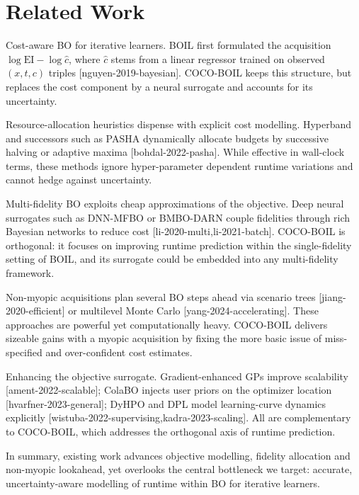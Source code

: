 \documentclass{article}
\begin{document}
\section{Related Work}
Cost-aware BO for iterative learners. BOIL first formulated the acquisition $\log \mathrm{EI} - \log \hat{c}$, where $\hat{c}$ stems from a linear regressor trained on observed $(x,t,c)$ triples [nguyen-2019-bayesian]. COCO-BOIL keeps this structure, but replaces the cost component by a neural surrogate and accounts for its uncertainty.

Resource-allocation heuristics dispense with explicit cost modelling. Hyperband and successors such as PASHA dynamically allocate budgets by successive halving or adaptive maxima [bohdal-2022-pasha]. While effective in wall-clock terms, these methods ignore hyper-parameter dependent runtime variations and cannot hedge against uncertainty.

Multi-fidelity BO exploits cheap approximations of the objective. Deep neural surrogates such as DNN-MFBO or BMBO-DARN couple fidelities through rich Bayesian networks to reduce cost [li-2020-multi,li-2021-batch]. COCO-BOIL is orthogonal: it focuses on improving runtime prediction within the single-fidelity setting of BOIL, and its surrogate could be embedded into any multi-fidelity framework.

Non-myopic acquisitions plan several BO steps ahead via scenario trees [jiang-2020-efficient] or multilevel Monte Carlo [yang-2024-accelerating]. These approaches are powerful yet computationally heavy. COCO-BOIL delivers sizeable gains with a myopic acquisition by fixing the more basic issue of miss-specified and over-confident cost estimates.

Enhancing the objective surrogate. Gradient-enhanced GPs improve scalability [ament-2022-scalable]; ColaBO injects user priors on the optimizer location [hvarfner-2023-general]; DyHPO and DPL model learning-curve dynamics explicitly [wistuba-2022-supervising,kadra-2023-scaling]. All are complementary to COCO-BOIL, which addresses the orthogonal axis of runtime prediction.

In summary, existing work advances objective modelling, fidelity allocation and non-myopic lookahead, yet overlooks the central bottleneck we target: accurate, uncertainty-aware modelling of runtime within BO for iterative learners.
\end{document}
